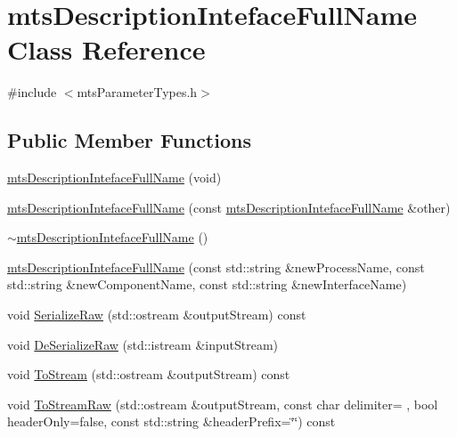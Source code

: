 \hypertarget{classmts_description_inteface_full_name}{}\section{mts\+Description\+Inteface\+Full\+Name Class Reference}
\label{classmts_description_inteface_full_name}


{\ttfamily \#include $<$mts\+Parameter\+Types.\+h$>$}

\subsection*{Public Member Functions}
\begin{DoxyCompactItemize}
\item 
\hyperlink{classmts_description_inteface_full_name_aba738688e0226daabddf5893ca0c01bb}{mts\+Description\+Inteface\+Full\+Name} (void)
\item 
\hyperlink{classmts_description_inteface_full_name_acc4b8572e3e5222aa06f67018b89c301}{mts\+Description\+Inteface\+Full\+Name} (const \hyperlink{classmts_description_inteface_full_name}{mts\+Description\+Inteface\+Full\+Name} \&other)
\item 
\hyperlink{classmts_description_inteface_full_name_adb8dc20a07bdc738c817655cff779ac3}{$\sim$mts\+Description\+Inteface\+Full\+Name} ()
\item 
\hyperlink{classmts_description_inteface_full_name_abfb76635a4d91c2953be2ee3e2d47c3c}{mts\+Description\+Inteface\+Full\+Name} (const std\+::string \&new\+Process\+Name, const std\+::string \&new\+Component\+Name, const std\+::string \&new\+Interface\+Name)
\item 
void \hyperlink{classmts_description_inteface_full_name_aa56968ec51f0bd45242972cd8d96b1f0}{Serialize\+Raw} (std\+::ostream \&output\+Stream) const 
\item 
void \hyperlink{classmts_description_inteface_full_name_ae678e3f1ffdca5fb96b849b030b010cd}{De\+Serialize\+Raw} (std\+::istream \&input\+Stream)
\item 
void \hyperlink{classmts_description_inteface_full_name_aada59891e3b35682b6c741029ee04e1d}{To\+Stream} (std\+::ostream \&output\+Stream) const 
\item 
void \hyperlink{classmts_description_inteface_full_name_a78d76c47edc3782946d3185ec6b3c120}{To\+Stream\+Raw} (std\+::ostream \&output\+Stream, const char delimiter= \textquotesingle{} \textquotesingle{}, bool header\+Only=false, const std\+::string \&header\+Prefix=\char`\"{}\char`\"{}) const 

\end{DoxyCompactItemize}
